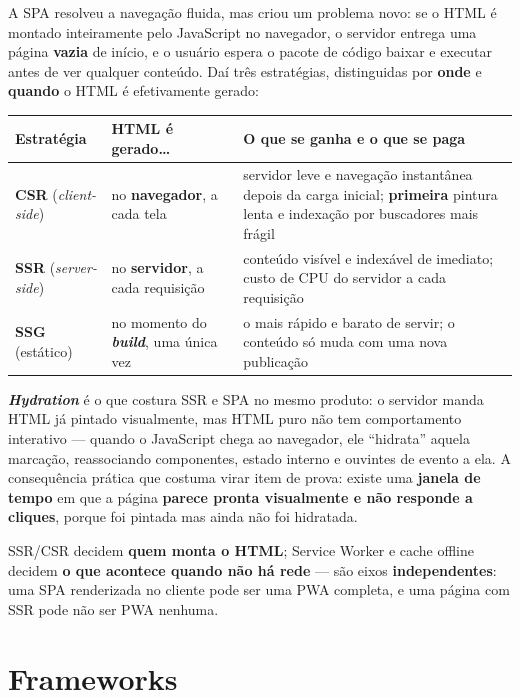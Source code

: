 \begin{conceito}
A SPA resolveu a navegação fluida, mas criou um problema novo: se o HTML
é montado inteiramente pelo JavaScript no navegador, o servidor entrega
uma página \textbf{vazia} de início, e o usuário espera o pacote de
código baixar e executar antes de ver qualquer conteúdo. Daí três
estratégias, distinguidas por \textbf{onde} e \textbf{quando} o HTML é
efetivamente gerado:

\begin{center}
\begin{tabular}{@{}p{3.1cm}p{3.5cm}p{4.6cm}@{}}
\toprule
\textbf{Estratégia} & \textbf{HTML é gerado\ldots} & \textbf{O que se
ganha e o que se paga} \\
\midrule
\textbf{CSR} (\textit{client-side}) & no \textbf{navegador}, a cada tela
& servidor leve e navegação instantânea depois da carga inicial;
\textbf{primeira} pintura lenta e indexação por buscadores mais frágil \\
\textbf{SSR} (\textit{server-side}) & no \textbf{servidor}, a cada
requisição & conteúdo visível e indexável de imediato; custo de CPU do
servidor a cada requisição \\
\textbf{SSG} (estático) & no momento do \textbf{\textit{build}}, uma
única vez & o mais rápido e barato de servir; o conteúdo só muda com uma
nova publicação \\
\bottomrule
\end{tabular}
\end{center}

\textbf{\textit{Hydration}} é o que costura SSR e SPA no mesmo produto: o
servidor manda HTML já pintado visualmente, mas HTML puro não tem
comportamento interativo --- quando o JavaScript chega ao navegador, ele
“hidrata” aquela marcação, reassociando componentes, estado interno e
ouvintes de evento a ela. A consequência prática que costuma virar item
de prova: existe uma \textbf{janela de tempo} em que a página
\textbf{parece pronta visualmente e não responde a cliques}, porque foi
pintada mas ainda não foi hidratada.

SSR/CSR decidem \textbf{quem monta o HTML}; Service Worker e cache
offline decidem \textbf{o que acontece quando não há rede} --- são eixos
\textbf{independentes}: uma SPA renderizada no cliente pode ser uma PWA
completa, e uma página com SSR pode não ser PWA nenhuma.
\end{conceito}

\section{Frameworks}

